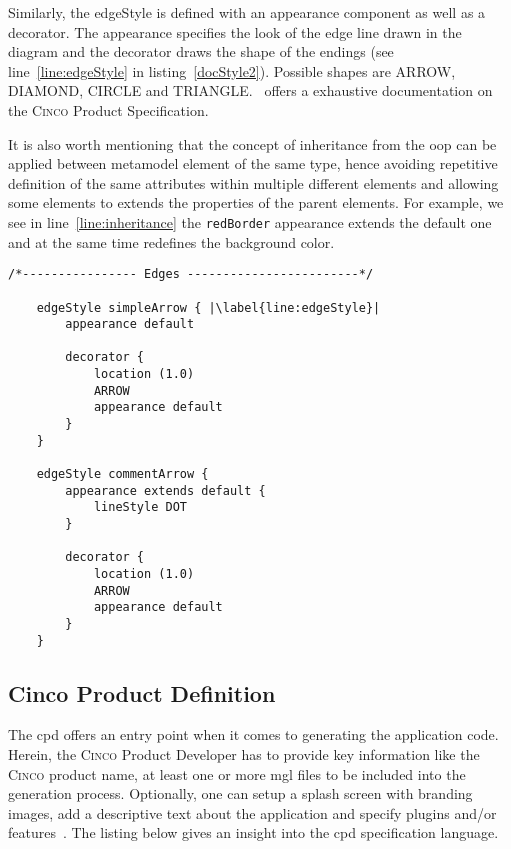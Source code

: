 Similarly, the edgeStyle is defined with an appearance component as well as a decorator. The appearance specifies the look of the edge line drawn in the diagram and the decorator draws the shape of the endings (see line~\ref{line:edgeStyle} in listing~\ref{docStyle2}). Possible shapes are ARROW, DIAMOND, CIRCLE and TRIANGLE\@.~\cite{gitlabcinco} offers a exhaustive documentation on the \textsc{Cinco} Product Specification.

It is also worth mentioning that the concept of inheritance from the \acrfull{oop} can be applied between metamodel element of the same type, hence avoiding repetitive definition of the same attributes within multiple different elements and allowing some elements to extends the properties of the parent elements. For example, we see in line~\ref{line:inheritance} the \lstinline{redBorder} appearance extends the default one and at the same time redefines the background color.

\begin{lstlisting}[language=MGL, caption={Doc.style part 2}, label=docStyle2, escapechar=|, name=docMSL]
    /*---------------- Edges ------------------------*/

    edgeStyle simpleArrow { |\label{line:edgeStyle}|
        appearance default

        decorator {
            location (1.0)
            ARROW
            appearance default
        }
    }

    edgeStyle commentArrow {
        appearance extends default {
            lineStyle DOT
        }

        decorator {
            location (1.0)
            ARROW
            appearance default
        }
    }
\end{lstlisting}

\subsection{Cinco Product Definition}\label{sec:CPD}

The \acrfull{cpd} offers an entry point when it comes to generating the application code. Herein, the \textsc{Cinco} Product Developer has to provide key information like the \textsc{Cinco} product name, at least one or more \acrshort{mgl} files to be included into the generation process. Optionally, one can setup a splash screen with branding images, add a descriptive text about the application and specify plugins and/or features~\cite{gitlabcinco}.
The listing below gives an insight into the \acrshort{cpd} specification language.

